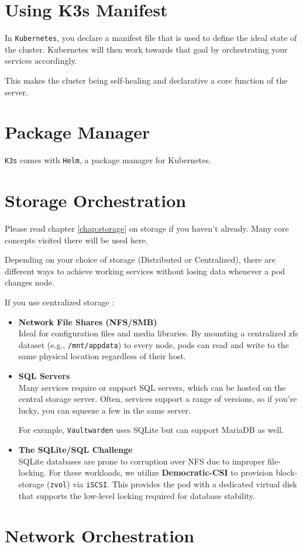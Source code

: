 \section{Using K3s Manifest}
In \texttt{Kubernetes}, you declare a manifest file that is used to define the ideal state of the cluster. Kubernetes will then work towards that goal by orchestrating your services accordingly.

This makes the cluster being self-healing and declarative a core function of the server.

\section{Package Manager}
\texttt{K3s} comes with \texttt{Helm}, a package manager for Kubernetes.

\section{Storage Orchestration}\label{section:pod-storage}
Please read chapter \ref{chap:storage} on storage if you haven't already. Many core concepts visited there will be used here.

Depending on your choice of storage (Distributed or Centralized), there are different ways to achieve working services without losing data whenever a pod changes node.

If you use centralized storage :
\begin{itemize}
	\item \textbf{Network File Shares (NFS/SMB)} \\
	Ideal for configuration files and media libraries. 
	By mounting a centralized \gls{zfs} dataset (e.g., \texttt{/mnt/appdata}) to every node, pods can read and write to the same physical location regardless of their host.
	
	\item \textbf{SQL Servers} \\
	Many services require or support SQL servers, which can be hosted on the central storage server. Often, services support a range of versions, so if you're lucky, you can squeeze a few in the same server. 
	
	For exemple, \texttt{Vaultwarden} uses SQLite but can support MariaDB as well. 
	
	\item \textbf{The SQLite/SQL Challenge} \\
	SQLite databases are prone to corruption over NFS due to improper file-locking.
	For these workloads, we utilize \textbf{Democratic-CSI} to provision block-storage (\texttt{zvol}) via \texttt{iSCSI}. 
	This provides the pod with a dedicated virtual disk that supports the low-level locking required for database stability.
\end{itemize}



\section{Network Orchestration}\label{section:pod-network}
